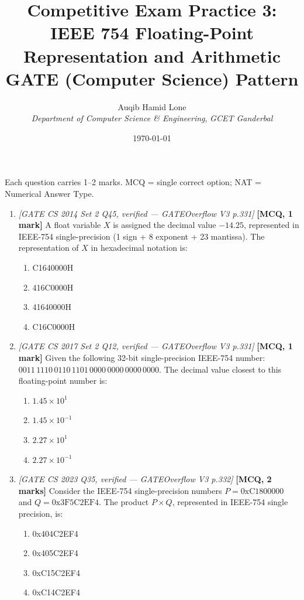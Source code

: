 \documentclass[11pt]{article}
\title{Competitive Exam Practice 3: IEEE 754 Floating-Point Representation and Arithmetic\\\large GATE (Computer Science) Pattern}
\author{Auqib Hamid Lone\\[0.3em]
  \emph{Department of Computer Science \& Engineering}, \emph{GCET Ganderbal}}
\date{\today}
\begin{document}
\maketitle

\noindent Each question carries 1--2 marks. MCQ = single correct option; NAT = Numerical Answer Type.

\begin{enumerate}
\item[\textbf{Q1}] \textit{[GATE CS 2014 Set 2 Q45, verified --- GATEOverflow V3 p.331]} \textbf{[MCQ, 1 mark]} A float variable $X$ is assigned the decimal value $-14.25$, represented in IEEE-754 single-precision (1 sign + 8 exponent + 23 mantissa). The representation of $X$ in hexadecimal notation is:
\begin{enumerate}
  \item[(A)] C1640000H
  \item[(B)] 416C0000H
  \item[(C)] 41640000H
  \item[(D)] C16C0000H
\end{enumerate}

\item[\textbf{Q2}] \textit{[GATE CS 2017 Set 2 Q12, verified --- GATEOverflow V3 p.331]} \textbf{[MCQ, 1 mark]} Given the following 32-bit single-precision IEEE-754 number: $0011\,1110\,0110\,1101\,0000\,0000\,0000\,0000$. The decimal value closest to this floating-point number is:
\begin{enumerate}
  \item[(A)] $1.45 \times 10^1$
  \item[(B)] $1.45 \times 10^{-1}$
  \item[(C)] $2.27 \times 10^1$
  \item[(D)] $2.27 \times 10^{-1}$
\end{enumerate}

\item[\textbf{Q3}] \textit{[GATE CS 2023 Q35, verified --- GATEOverflow V3 p.332]} \textbf{[MCQ, 2 marks]} Consider the IEEE-754 single-precision numbers $P = \text{0xC1800000}$ and $Q = \text{0x3F5C2EF4}$. The product $P \times Q$, represented in IEEE-754 single precision, is:
\begin{enumerate}
  \item[(A)] 0x404C2EF4
  \item[(B)] 0x405C2EF4
  \item[(C)] 0xC15C2EF4
  \item[(D)] 0xC14C2EF4
\end{enumerate}


\end{enumerate}
\end{document}
